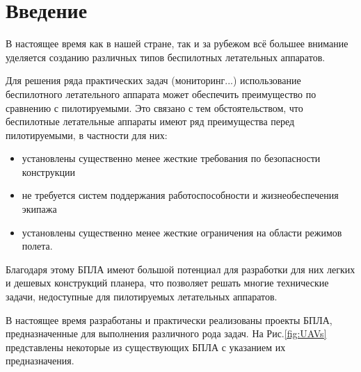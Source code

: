 \chapter*{Введение}

В настоящее время как в нашей стране, так и за рубежом всё большее внимание уделяется созданию различных типов беспилотных летательных аппаратов. 


Для решения ряда практических задач (мониторинг...) использование беспилотного летательного аппарата может обеспечить преимущество по сравнению с пилотируемыми. Это связано с тем обстоятельством, что беспилотные летательные аппараты имеют ряд преимущества перед пилотируемыми, в частности для них:

\begin{itemize}
\item установлены существенно менее жесткие требования по безопасности конструкции
\item не требуется систем поддержания работоспособности и жизнеобеспечения экипажа
\item установлены существенно менее жесткие ограничения на области режимов полета.
\end{itemize} 



Благодаря этому БПЛА имеют большой потенциал для разработки для них легких и дешевых конструкций планера, что позволяет решать многие технические задачи, недоступные для пилотируемых летательных аппаратов.

В настоящее время разработаны и практически реализованы проекты БПЛА, предназначенные для выполнения различного рода задач. На Рис.\ref{fig:UAVs} представлены некоторые из существующих БПЛА с указанием их предназначения.



